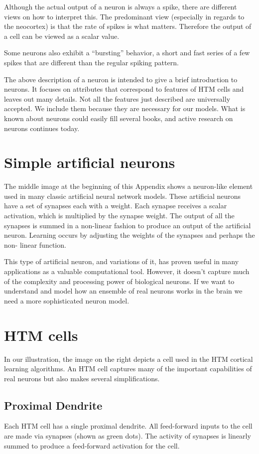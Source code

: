 \documentclass{report}
\begin{document}
Although the actual output of a neuron is always a spike, there are
different views on how to interpret this. The predominant view
(especially in regards to the neocortex) is that the rate of spikes is
what matters. Therefore the output of a cell can be viewed as a scalar
value.

Some neurons also exhibit a ``bursting'' behavior, a short and fast
series of a few spikes that are different than the regular spiking
pattern.

The above description of a neuron is intended to give a brief
introduction to neurons. It focuses on attributes that correspond to
features of HTM cells and leaves out many details. Not all the
features just described are universally accepted. We include them
because they are necessary for our models. What is known about neurons
could easily fill several books, and active research on neurons
continues today.

\section*{Simple artificial neurons}
The middle image at the beginning of this Appendix shows a neuron-like
element used in many classic artificial neural network models. These
artificial neurons have a set of synapses each with a weight. Each
synapse receives a scalar activation, which is multiplied by the
synapse weight. The output of all the synapses is summed in a
non-linear fashion to produce an output of the artificial
neuron. Learning occurs by adjusting the weights of the synapses and
perhaps the non- linear function.

This type of artificial neuron, and variations of it, has proven
useful in many applications as a valuable computational tool. However,
it doesn't capture much of the complexity and processing power of
biological neurons. If we want to understand and model how an ensemble
of real neurons works in the brain we need a more sophisticated neuron
model.

\section*{HTM cells}
In our illustration, the image on the right depicts a cell used in the
HTM cortical learning algorithms. An HTM cell captures many of the
important capabilities of real neurons but also makes several
simplifications.

\subsection*{Proximal Dendrite}
Each HTM cell has a single proximal dendrite. All feed-forward inputs
to the cell are made via synapses (shown as green dots). The activity
of synapses is linearly summed to produce a feed-forward activation
for the cell.
\end{document}

